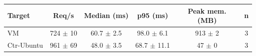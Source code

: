 \begin{tabular}{|l|c|c|c|c|c|}
\hline
\textbf{Target} & \textbf{Req/s} & \textbf{Median (ms)} & \textbf{p95 (ms)} & \textbf{Peak mem. (MB)} & \textbf{n} \\
\hline
VM & 724 $\pm$ 10 & 60.7 $\pm$ 2.5 & 98.0 $\pm$ 6.1 & 913 $\pm$ 2 & 3 \\
\hline
Ctr-Ubuntu & 961 $\pm$ 69 & 48.0 $\pm$ 3.5 & 68.7 $\pm$ 11.1 & 47 $\pm$ 0 & 3 \\
\hline
\end{tabular}
